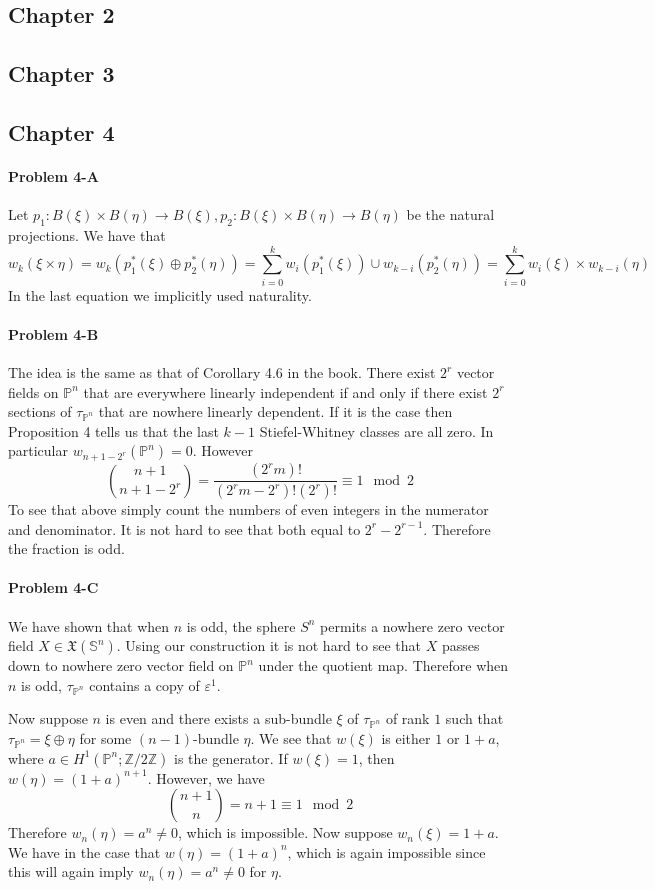 \documentclass[12pt]{article}
\theoremstyle{plain}
\theoremstyle{definition}
\newcommand{\IP}{\mathbb{P}}
\newcommand{\IS}{\mathbb{S}}
\newcommand{\IZ}{\mathbb{Z}}
\newcommand{\<}{\langle}
\renewcommand{\>}{\rangle}
\newcommand{\sm}{\varepsilon}
\begin{document}
\subsection*{Chapter 2}
\subsection*{Chapter 3}
\subsection*{Chapter 4}
\paragraph{Problem 4-A} Let $p_1 : B(\xi) \times B(\eta) \to B(\xi), p_2 : B(\xi) \times B(\eta) \to B(\eta)$ be the natural projections. We have that 
$$ w_k(\xi \times \eta) = w_k( p_1^*(\xi) \oplus p_2^*(\eta)) = \sum_{i = 0}^k w_i(p_1^*(\xi)) \cup w_{k-i}(p_2^*(\eta)) = \sum_{i = 0}^k w_i(\xi) \times w_{k - i}(\eta)$$
In the last equation we implicitly used naturality. 

\paragraph{Problem 4-B} The idea is the same as that of Corollary 4.6 in the book. There exist $2^r$ vector fields on $\IP^n$ that are everywhere linearly independent if and only if there exist $2^r$ sections of $\tau_{\IP^n}$ that are nowhere linearly dependent. If it is the case then Proposition 4 tells us that the last $ k - 1$ Stiefel-Whitney classes are all zero. In particular $ w_{n + 1 - 2^r} (\IP^n)= 0$. However 
$$ { n + 1 \choose n+1-2^r } = \frac{ (2^r m)! }{(2^r m - 2^r)! (2^r) !} \equiv 1 \mod 2 $$ 
To see that above simply count the numbers of even integers in the numerator and denominator. It is not hard to see that both equal to $2^r - 2^{r - 1}$. Therefore the fraction is odd.  

\paragraph{Problem 4-C}
We have shown that when $n$ is odd, the sphere $S^n$ permits a nowhere zero vector field $X \in \mathfrak{X}(\IS^n)$. Using our construction it is not hard to see that $X$ passes down to nowhere zero vector field on $\IP^n$ under the quotient map. Therefore when $n$ is odd, $\tau_{\IP^n}$ contains a copy of $\sm^1$. 

Now suppose $n$ is even and there exists a sub-bundle $\xi$ of $\tau_{\IP^n}$ of rank $1$ such that $\tau_{\IP^n} = \xi \oplus \eta$ for some $(n - 1)$-bundle $\eta$. We see that $w(\xi)$ is either $1$ or $1 + a$, where $a \in H^1(\IP^n; \IZ/2\IZ)$ is the generator. If $w(\xi) = 1$, then $w(\eta) = (1 + a)^{n + 1}$. However, we have 
$$ { n + 1 \choose n } = n + 1 \equiv 1 \mod 2 $$ Therefore $w_n (\eta) = a^n \neq 0$, which is impossible. Now suppose $w_n (\xi) = 1 + a$. We have in the case that $w(\eta) = (1 + a)^n$, which is again impossible since this will again imply $w_n(\eta) = a^n \neq 0$ for $\eta$. 
\end{document}

